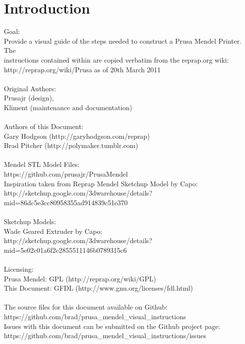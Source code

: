 \documentclass[twoside,a4paper,titlepage]{memoir}
\begin{document}
	\chapter*{Introduction}
	Goal:\\
	Provide a visual guide of the steps needed to construct a Prusa Mendel Printer. The\\
	instructions contained within are copied verbatim from the reprap.org wiki:\\
	http://reprap.org/wiki/Prusa as of 20th March 2011\\\\
	Original Authors:\\
	Prusajr (design),\\
	Kliment (maintenance and documentation)\\\\
	Authors of this Document:\\
	Gary Hodgson (http://garyhodgson.com/reprap)\\
    Brad Pitcher (http://polymaker.tumblr.com)\\\\
	Mendel STL Model Files:\\
	https://github.com/prusajr/PrusaMendel\\
	Inspiration taken from Reprap Mendel Sketchup Model by Capo:\\
	http://sketchup.google.com/3dwarehouse/details?mid=86dc5e3cc80958355ad914839c51e370\\\\
	Sketchup Models:\\
	Wade Geared Extruder by Capo:\\
	http://sketchup.google.com/3dwarehouse/details?mid=5e02c01a6f2c2855511146b0789315c6\\\\
	Licensing:\\
	Prusa Mendel: GPL (http://reprap.org/wiki/GPL)\\
	This Document: GFDL (http://www.gnu.org/licenses/fdl.html)\\\\
	The source files for this document available on Github:\\
	https://github.com/brad/prusa\_mendel\_visual\_instructions\\
	Issues with this document can be submitted on the Github project page:\\
	https://github.com/brad/prusa\_mendel\_visual\_instructions/issues\\
	
\end{document}
